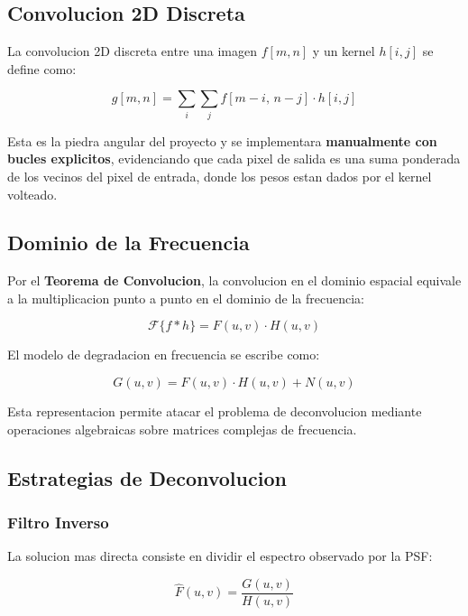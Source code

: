 \documentclass[11pt,a4paper]{article}
\begin{document}
\subsection{Convolucion 2D Discreta}

La convolucion 2D discreta entre una imagen $f[m,n]$ y un kernel $h[i,j]$ se define como:

\begin{equation}
\boxed{\; g[m,n] = \sum_{i} \sum_{j} f[m-i,\, n-j] \cdot h[i,j] \;}
\end{equation}

Esta es la piedra angular del proyecto y se implementara \textbf{manualmente con bucles explicitos}, evidenciando que cada pixel de salida es una suma ponderada de los vecinos del pixel de entrada, donde los pesos estan dados por el kernel volteado.

\subsection{Dominio de la Frecuencia}

Por el \textbf{Teorema de Convolucion}, la convolucion en el dominio espacial equivale a la multiplicacion punto a punto en el dominio de la frecuencia:

\begin{equation}
\mathcal{F}\{f * h\} = F(u,v) \cdot H(u,v)
\end{equation}

El modelo de degradacion en frecuencia se escribe como:

\begin{equation}
G(u,v) = F(u,v) \cdot H(u,v) + N(u,v)
\end{equation}

Esta representacion permite atacar el problema de deconvolucion mediante operaciones algebraicas sobre matrices complejas de frecuencia.

\subsection{Estrategias de Deconvolucion}

\subsubsection{Filtro Inverso}

La solucion mas directa consiste en dividir el espectro observado por la PSF:

\begin{equation}
\hat{F}(u,v) = \frac{G(u,v)}{H(u,v)}
\end{equation}
\end{document}
